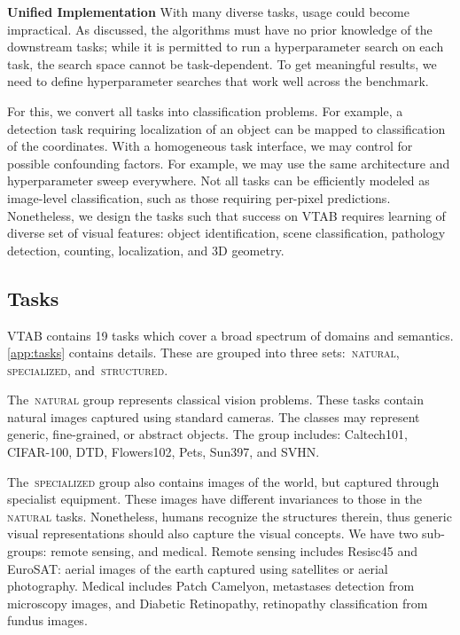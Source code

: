 \documentclass{article}
\newcommand{\myparagraph}[1]{\noindent\textbf{#1}\quad}
\DeclareRobustCommand{\taskNatural}{\raisebox{0.5pt}{\tikz{\fill[natural] (0cm,0cm) circle (.5ex);}}\,\textsc{natural}}
\DeclareRobustCommand{\taskSpecialized}{\raisebox{0.5pt}{\tikz{\fill[specialized] (0,0) circle (.5ex);}}\,\textsc{specialized}}
\DeclareRobustCommand{\taskStructured}{\raisebox{0.5pt}{\tikz{\fill[structured] (0,0) circle (.5ex);}}\,\textsc{structured}}
\begin{document}
\myparagraph{Unified Implementation}
With many diverse tasks, usage could become impractical.
As discussed, the algorithms must have no prior knowledge of the downstream tasks;
while it is permitted to run a hyperparameter search on each task, the search space cannot be task-dependent.
To get meaningful results, we need to define hyperparameter searches that work well across the benchmark.

For this, we convert all tasks into classification problems.
For example, a detection task requiring localization of an object can be mapped to classification of the  coordinates.
With a homogeneous task interface, we may control for possible confounding factors.
For example, we may use the same architecture and hyperparameter sweep everywhere.
Not all tasks can be efficiently modeled as image-level classification, such as those requiring per-pixel predictions.
Nonetheless, we design the tasks such that success on VTAB requires learning of diverse set of visual features:
object identification, scene classification, pathology detection, counting, localization, and 3D geometry.


\subsection{Tasks\label{sec:tasks}}
VTAB contains 19  tasks which cover a broad spectrum of domains and semantics. \cref{app:tasks} contains details. These are grouped into three sets: \taskNatural{}, \taskSpecialized{}, and \taskStructured{}.

The \taskNatural{} group represents classical vision problems.
These tasks contain natural images captured using standard cameras.
The classes may represent generic, fine-grained, or abstract objects.
The group includes: Caltech101, CIFAR-100, DTD, Flowers102, Pets, Sun397, and SVHN.

The \taskSpecialized{} group also contains images of the world, but captured through specialist equipment.
These images have different invariances to those in the \taskNatural{} tasks.
Nonetheless, humans recognize the structures therein, thus generic visual representations should also capture the visual concepts.
We have two sub-groups: remote sensing, and medical.
Remote sensing includes Resisc45 and EuroSAT: aerial images of the earth captured using satellites or aerial photography.
Medical includes Patch Camelyon, metastases detection from microscopy images, and Diabetic Retinopathy, retinopathy classification from fundus images.
\end{document}
